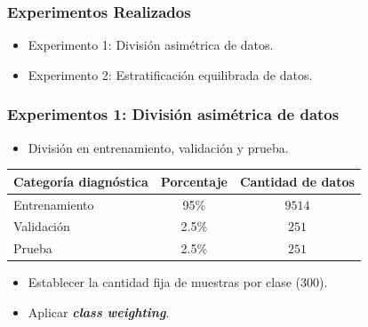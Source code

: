 \documentclass{beamer}
\begin{document}
\begin{frame}
  \frametitle{Experimentos Realizados}
  \begin{itemize}
    \item Experimento 1: División asimétrica de datos.
    \item Experimento 2: Estratificación equilibrada de datos.
  \end{itemize}
\end{frame}

\begin{frame}
  \frametitle{Experimentos 1: División asimétrica de datos}

  \begin{itemize}
    \item División en entrenamiento, validación y prueba.
  \end{itemize}

  \begin{table}[H]
   \small
   \centering
   \begin{tabular}{lcc}
   \hline
   \textbf{Categoría diagnóstica} & \textbf{Porcentaje} & \textbf{Cantidad de datos} \\
   \hline
   Entrenamiento & 95\% & $9514$ \\
   Validación    & 2.5\% & $251$  \\
   Prueba        & 2.5\% & $251$  \\ \hline
   \end{tabular}
   
   \label{table:data_distribution_e1}
   \end{table}

  \begin{itemize}
    \item <2-> Establecer la cantidad fija de muestras por clase (300).
    \item <3-> Aplicar \textbf{\textit{class weighting}}.
  \end{itemize}

\end{frame}
\end{document}
